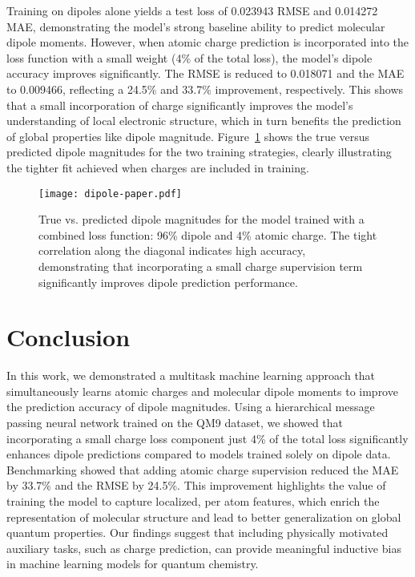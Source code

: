 \documentclass[journal=jctcce,manuscript=article]{achemso}
\begin{document}
Training on dipoles alone yields a test loss of 0.023943 RMSE and 0.014272 MAE, demonstrating the model's strong baseline ability to predict molecular dipole moments. However, when atomic charge prediction is incorporated into the loss function with a small weight (4\% of the total loss), the model's dipole accuracy improves significantly. The RMSE is reduced to 0.018071 and the MAE to 0.009466, reflecting a 24.5\% and 33.7\% improvement, respectively. This shows that a small incorporation of charge significantly improves the model’s understanding of local electronic structure, which in turn benefits the prediction of global properties like dipole magnitude. Figure~\ref{fig:charge_combined} shows the true versus predicted dipole magnitudes for the two training strategies, clearly illustrating the tighter fit achieved when charges are included in training.

\begin{figure}[hptb]
    \centering
    \texttt{[image: dipole-paper.pdf]}
    \caption{
        True vs. predicted dipole magnitudes for the model trained with a combined loss function: 96\% dipole and 4\% atomic charge. The tight correlation along the diagonal indicates high accuracy, demonstrating that incorporating a small charge supervision term significantly improves dipole prediction performance.
    }


    \label{fig:charge_combined}
\end{figure}
\newpage






\newpage


\section{Conclusion}

In this work, we demonstrated a multitask machine learning approach that simultaneously learns atomic charges and molecular dipole moments to improve the prediction accuracy of dipole magnitudes. Using a hierarchical message passing neural network trained on the QM9 dataset, we showed that incorporating a small charge loss component just 4\% of the total loss significantly enhances dipole predictions compared to models trained solely on dipole data. Benchmarking showed that adding atomic charge supervision reduced the MAE by 33.7\% and the RMSE by 24.5\%.
 This improvement highlights the value of training the model to capture localized, per atom features, which enrich the representation of molecular structure and lead to better generalization on global quantum properties. Our findings suggest that including physically motivated auxiliary tasks, such as charge prediction, can provide meaningful inductive bias in machine learning models for quantum chemistry. 
\end{document}
